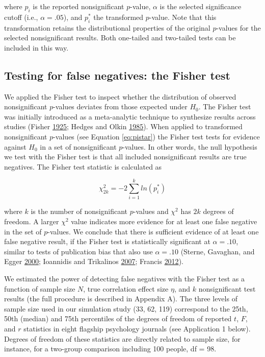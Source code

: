 \documentclass[a5paper]{book}
\begin{document}
where \(p_i\) is the reported nonsignificant \(p\)-value, \(\alpha\) is
the selected significance cutoff (i.e., \(\alpha=.05\)), and \(p^*_i\)
the transformed \(p\)-value. Note that this transformation retains the
distributional properties of the original \(p\)-values for the selected
nonsignificant results. Both one-tailed and two-tailed tests can be
included in this way.

\subsection{Testing for false negatives: the Fisher
test}\label{testing-for-false-negatives-the-fisher-test}

We applied the Fisher test to inspect whether the distribution of
observed nonsignificant \(p\)-values deviates from those expected under
\(H_0\). The Fisher test was initially introduced as a meta-analytic
technique to synthesize results across studies (Fisher
\protect\hyperlink{ref-Fisher1925-jl}{1925}; Hedges and Olkin
\protect\hyperlink{ref-Hedges1985-dy}{1985}). When applied to
transformed nonsignificant \(p\)-values (see Equation \eqref{eq:pistar})
the Fisher test tests for evidence against \(H_0\) in a set of
nonsignificant \(p\)-values. In other words, the null hypothesis we test
with the Fisher test is that all included nonsignificant results are
true negatives. The Fisher test statistic is calculated as

\begin{equation}
\chi^2_{2k}=-2\sum\limits^k_{i=1}ln(p^*_i)
\label{eq:fishertest}
\end{equation}

where \(k\) is the number of nonsignificant \(p\)-values and \(\chi^2\)
has \(2k\) degrees of freedom. A larger \(\chi^2\) value indicates more
evidence for at least one false negative in the set of \(p\)-values. We
conclude that there is sufficient evidence of at least one false
negative result, if the Fisher test is statistically significant at
\(\alpha=.10\), similar to tests of publication bias that also use
\(\alpha=.10\) (Sterne, Gavaghan, and Egger
\protect\hyperlink{ref-doi:10.1016ux2fs0895-43560000242-0}{2000};
Ioannidis and Trikalinos
\protect\hyperlink{ref-doi:10.1177ux2f1740774507079441}{2007}; Francis
\protect\hyperlink{ref-doi:10.3758ux2fs13423-012-0227-9}{2012}).

We estimated the power of detecting false negatives with the Fisher test
as a function of sample size \(N\), true correlation effect size
\(\eta\), and \(k\) nonsignificant test results (the full procedure is
described in Appendix A). The three levels of sample size used in our
simulation study (33, 62, 119) correspond to the 25th, 50th (median) and
75th percentiles of the degrees of freedom of reported \(t\), \(F\), and
\(r\) statistics in eight flagship psychology journals (see Application
1 below). Degrees of freedom of these statistics are directly related to
sample size, for instance, for a two-group comparison including 100
people, df = 98.
\end{document}
